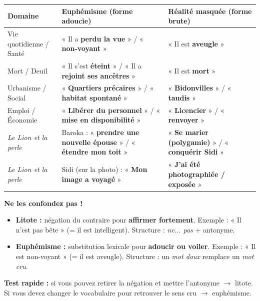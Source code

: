 \documentclass[11pt]{article}
\newcommand{\cle}[1]{{\popxbold\color{popdark}#1}}
\begin{document}
\begin{exemplebox}
\begin{center}
\begin{tabularx}{\linewidth}{|l|X|X|}
\hline
\rowcolor{popblueL}\textbf{Domaine} & \textbf{Euphémisme (forme adoucie)} & \textbf{Réalité masquée (forme brute)} \\
\hline
Vie quotidienne / Santé & « Il a \textbf{perdu la vue} » / « \textbf{non-voyant} » & « Il est \textbf{aveugle} » \\
\hline
Mort / Deuil & « Il s'est \textbf{éteint} » / « Il a \textbf{rejoint ses ancêtres} » & « Il est \textbf{mort} » \\
\hline
Urbanisme / Social & « \textbf{Quartiers précaires} » / « \textbf{habitat spontané} » & « \textbf{Bidonvilles} » / « \textbf{taudis} » \\
\hline
Emploi / Économie & « \textbf{Libérer du personnel} » / « \textbf{mise en disponibilité} » & « \textbf{Licencier} » / « \textbf{renvoyer} » \\
\hline
\emph{Le Lion et la perle} & Baroka : « \textbf{prendre une nouvelle épouse} » / « \textbf{étendre mon toit} » & « \textbf{Se marier (polygamie)} » / « \textbf{conquérir Sidi} » \\
\hline
\emph{Le Lion et la perle} & Sidi (sur la photo) : « \textbf{Mon image a voyagé} » & « \textbf{J'ai été photographiée / exposée} » \\
\hline
\end{tabularx}
\end{center}
\end{exemplebox}

\begin{attention}
\textbf{Ne les confondez pas !}
\begin{itemize}
    \item \textbf{Litote :} \cle{négation du contraire} pour \textbf{affirmer fortement}. Exemple : « Il n'est pas bête » (= il est intelligent). Structure : \emph{ne... pas} + antonyme.
    \item \textbf{Euphémisme :} \cle{substitution lexicale} pour \textbf{adoucir ou voiler}. Exemple : « Il est non-voyant » (= il est aveugle). Structure : un \emph{mot doux} remplace un \emph{mot cru}.
\end{itemize}
\textbf{Test rapide :} si vous pouvez retirer la négation et mettre l'antonyme $\rightarrow$ litote. Si vous devez changer le vocabulaire pour retrouver le sens cru $\rightarrow$ euphémisme.
\end{attention}
\end{document}
